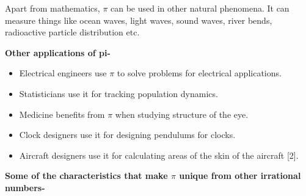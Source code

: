 \documentclass[12pt]{article}
\begin{document}
\begin{justify}
Apart from mathematics, $ \pi $  can be used in other natural phenomena. It can measure things like ocean waves, light waves, sound waves, river bends, radioactive particle distribution etc.
\end{justify}\par

\begin{justify}
\textbf{Other applications of pi-}
\end{justify}\par

\begin{itemize}
	\item Electrical engineers use $ \pi $  to solve problems for electrical applications.\par

	\item Statisticians use it for tracking population dynamics. \par

	\item Medicine benefits from $ \pi $  when studying structure of the eye.\par

	\item Clock designers use it for designing pendulums for clocks.\par

	\item Aircraft designers use it for calculating areas of the skin of the aircraft [2].
\end{itemize}\par


\vspace{\baselineskip}
\begin{justify}
\textbf{Some of the characteristics that make $ \pi $  unique from other irrational numbers-}
\end{justify}\par
\end{document}
